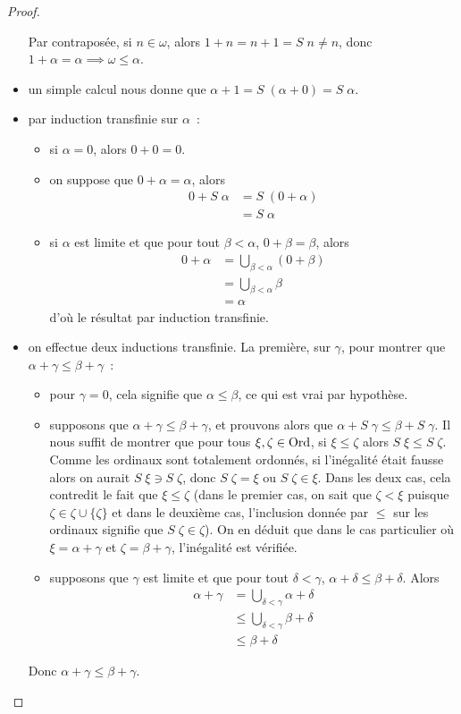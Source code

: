\begin{proof}
\begin{itemize}
    Par contraposée, si $n \in \omega$, alors $1 + n = n + 1 = S\;n \neq n$,
    donc $1 + \alpha = \alpha \implies \omega \leq \alpha$.
  \item un simple calcul nous donne que
    $\alpha + 1 = S\;(\alpha + 0) = S\;\alpha$.
  \item par induction transfinie sur $\alpha$~:
    \begin{itemize}
    \item si $\alpha = 0$, alors $0 + 0 = 0$.
    \item on suppose que $0 + \alpha= \alpha$, alors
      \begin{align*}
        0 + S\;\alpha &= S\;(0+\alpha) \\
        &= S\;\alpha
      \end{align*}
    \item si $\alpha$ est limite et que pour tout $\beta < \alpha$,
      $0 + \beta = \beta$, alors
      \begin{align*}
        0 + \alpha &= \bigcup_{\beta < \alpha} (0 + \beta)\\
        &= \bigcup_{\beta < \alpha} \beta \\
        &= \alpha
      \end{align*}
      d'où le résultat par induction transfinie.
    \end{itemize}
  \item on effectue deux inductions transfinie. La première, sur $\gamma$, pour
    montrer que $\alpha + \gamma \leq \beta + \gamma$~:
    \begin{itemize}
    \item pour $\gamma = 0$, cela signifie que $\alpha \leq \beta$, ce qui est
      vrai par hypothèse.
    \item supposons que $\alpha + \gamma \leq \beta + \gamma$, et prouvons alors
      que $\alpha + S\;\gamma \leq \beta + S\;\gamma$. Il nous suffit de montrer
      que pour tous $\xi,\zeta\in\operatorname{Ord}$, si $\xi \leq \zeta$ alors
      $S\;\xi\leq S\;\zeta$. Comme les ordinaux sont totalement ordonnés, si
      l'inégalité était fausse alors on aurait $S\;\xi \ni S\;\zeta$, donc
      $S\;\zeta = \xi$ ou $S\;\zeta\in \xi$. Dans les deux cas, cela contredit
      le fait que $\xi \leq \zeta$ (dans le premier cas, on sait que
      $\zeta < \xi$ puisque $\zeta \in \zeta \cup \{\zeta\}$ et dans le
      deuxième cas, l'inclusion donnée par $\leq$ sur les ordinaux signifie que
      $S\;\zeta \in \zeta$). On en déduit que dans le cas particulier où
      $\xi = \alpha + \gamma$ et $\zeta = \beta + \gamma$, l'inégalité est
      vérifiée.
    \item supposons que $\gamma$ est limite et que pour tout $\delta < \gamma$,
      $\alpha + \delta \leq \beta + \delta$. Alors
      \begin{align*}
        \alpha + \gamma &= \bigcup_{\delta < \gamma} \alpha + \delta\\
        &\leq \bigcup_{\delta < \gamma} \beta + \delta \\
        &\leq \beta + \delta
      \end{align*}
    \end{itemize}
    Donc $\alpha + \gamma \leq \beta + \gamma$.


\end{itemize}
\end{proof}
